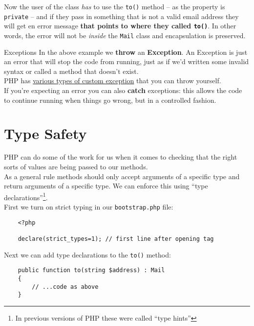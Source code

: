 Now the user of the class \textit{has} to use the \texttt{to()} method – as the property is \texttt{private} – and if they pass in something that is not a valid email address they will get en error message \textbf{that points to where they called \texttt{to()}}. In other words, the error will not be \textit{inside} the \texttt{Mail} class and encapsulation is preserved.

\begin{infobox}{Exceptions}
    In the above example we \textbf{throw} an \textbf{Exception}. An Exception is just an error that will stop the code from running, just as if we'd written some invalid syntax or called a method that doesn't exist.
    \\

    PHP has \href{https://www.php.net/manual/en/spl.exceptions.php}{various types of custom exception} that you can throw yourself.
    \\

    If you're expecting an error you can also \textbf{catch} exceptions: this allows the code to continue running when things go wrong, but in a controlled fashion.
\end{infobox}


\section{Type Safety}

PHP can do some of the work for us when it comes to checking that the right sorts of values are being passed to our methods.
\\

As a general rule methods should only accept arguments of a specific type and return arguments of a specific type. We can enforce this using ``type declarations''\footnote{In previous versions of PHP these were called ``type hints''}.
\\

First we turn on strict typing in our \texttt{bootstrap.php} file:

\begin{verbatim}
    <?php

    declare(strict_types=1); // first line after opening tag
\end{verbatim}

Next we can add type declarations to the \texttt{to()} method:

\begin{verbatim}
    public function to(string $address) : Mail
    {
        // ...code as above
    }
\end{verbatim}

